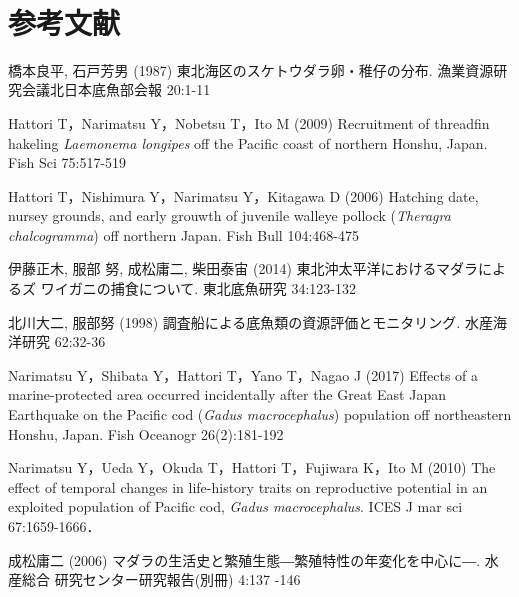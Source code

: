 \documentclass[11pt]{article} %
\begin{document}
\begin{linenumbers}
\ \ \ \ \ \ \ \ \ \ 
\section{参考文献}
\hangindent=30pt
\noindent
橋本良平, 石戸芳男 (1987) 東北海区のスケトウダラ卵・稚仔の分布. 漁業資源研究会議北日本底魚部会報 20:1-11

\hangindent=30pt
\noindent
Hattori T，Narimatsu Y，Nobetsu T，Ito M (2009) Recruitment of threadfin hakeling \textit{Laemonema longipes} off the Pacific coast of northern Honshu, Japan. Fish Sci 75:517-519

\hangindent=30pt
\noindent
Hattori T，Nishimura Y，Narimatsu Y，Kitagawa D (2006) Hatching date, nursey grounds, and early grouwth of juvenile walleye pollock (\textit{Theragra chalcogramma}) off northern Japan. Fish Bull 104:468-475


\hangindent=30pt
\noindent
伊藤正木, 服部 努, 成松庸二, 柴田泰宙 (2014) 東北沖太平洋におけるマダラによるズ
ワイガニの捕食について. 東北底魚研究 34:123-132

\hangindent=30pt
\noindent
北川大二, 服部努 (1998) 調査船による底魚類の資源評価とモニタリング. 水産海洋研究 62:32-36


\hangindent=30pt
\noindent
Narimatsu Y，Shibata Y，Hattori T，Yano T，Nagao J (2017) Effects of a marine-protected area occurred incidentally after the Great East Japan Earthquake on the Pacific cod (\textit{Gadus macrocephalus}) population off northeastern Honshu, Japan. Fish Oceanogr 26(2):181-192

\hangindent=30pt
\noindent
Narimatsu Y，Ueda Y，Okuda T，Hattori T，Fujiwara K，Ito M (2010) The effect of temporal changes in life-history traits on reproductive potential in an exploited population of Pacific cod, \textit{Gadus macrocephalus}. ICES J mar sci 67:1659-1666．

\hangindent=30pt
\noindent
成松庸二 (2006) マダラの生活史と繁殖生態―繁殖特性の年変化を中心に―. 水産総合
研究センター研究報告(別冊) 4:137 -146


\end{linenumbers}
\end{document}
